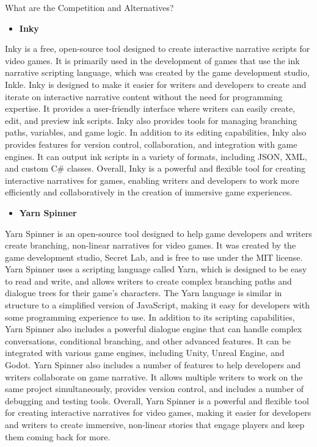  What are the Competition and Alternatives?

 \begin{itemize}
                \item \textbf{Inky}
 \end{itemize}
 
Inky is a free, open-source tool designed to create interactive narrative scripts for video games. It is primarily used in the development of games that use the ink narrative scripting language, which was created by the game development studio, Inkle.
Inky is designed to make it easier for writers and developers to create and iterate on interactive narrative content without the need for programming expertise. It provides a user-friendly interface where writers can easily create, edit, and preview ink scripts. Inky also provides tools for managing branching paths, variables, and game logic.
In addition to its editing capabilities, Inky also provides features for version control, collaboration, and integration with game engines. It can output ink scripts in a variety of formats, including JSON, XML, and custom C# classes.
Overall, Inky is a powerful and flexible tool for creating interactive narratives for games, enabling writers and developers to work more efficiently and collaboratively in the creation of immersive game experiences.
\begin{itemize}
                \item \textbf{Yarn Spinner}
 \end{itemize}
 
 Yarn Spinner is an open-source tool designed to help game developers and writers create branching, non-linear narratives for video games. It was created by the game development studio, Secret Lab, and is free to use under the MIT license.
Yarn Spinner uses a scripting language called Yarn, which is designed to be easy to read and write, and allows writers to create complex branching paths and dialogue trees for their game's characters. The Yarn language is similar in structure to a simplified version of JavaScript, making it easy for developers with some programming experience to use.
In addition to its scripting capabilities, Yarn Spinner also includes a powerful dialogue engine that can handle complex conversations, conditional branching, and other advanced features. It can be integrated with various game engines, including Unity, Unreal Engine, and Godot.
Yarn Spinner also includes a number of features to help developers and writers collaborate on game narrative. It allows multiple writers to work on the same project simultaneously, provides version control, and includes a number of debugging and testing tools.
Overall, Yarn Spinner is a powerful and flexible tool for creating interactive narratives for video games, making it easier for developers and writers to create immersive, non-linear stories that engage players and keep them coming back for more.

